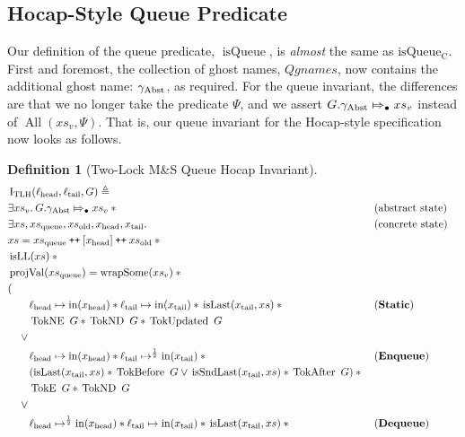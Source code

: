 \documentclass[a4paper, 10pt]{report}
\theoremstyle{definition}
\newtheorem{definition}{Definition}[section]
\newcommand{\msq}{M\&S Queue}
\newcommand{\tlmsq}{Two-Lock \msq{}}
\newcommand{\isqueue}{\operatorname{isQueue}}
\newcommand{\isqueueconc}{\operatorname{isQueue_{C}}}
\newcommand{\TLQueueInvariantHocap}{\operatorname{I_{TLH}}}
\newcommand{\Qgnames}{Qgnames}
\newcommand{\xsc}{xs}
\newcommand{\xsqueue}{xs_{\mathrm{queue}}}
\newcommand{\xsold}{xs_{\mathrm{old}}}
\newcommand{\isLL}{\operatorname{isLL}}
\newcommand{\AllP}{\operatorname{All}}
\newcommand{\projval}{\operatorname{projVal}}
\newcommand{\wrapsome}{\operatorname{wrapSome}}
\newcommand{\isLast}{\operatorname{isLast}}
\newcommand{\isSndLast}{\operatorname{isSndLast}}
\newcommand{\locN}[1]{\loc_{\mathrm{#1}}}
\newcommand{\lochead}{\locN{head}}
\newcommand{\loctail}{\locN{tail}}
\newcommand{\nIn}[1]{\operatorname{in}(#1)}
\newcommand{\node}{x}
\newcommand{\nodeN}[1]{\node_{\mathrm{#1}}}
\newcommand{\nodehead}{\nodeN{head}}
\newcommand{\nodetail}{\nodeN{tail}}
\newcommand{\absvalueList}{xs_v}
\newcommand{\StaticState}{\textbf{Static}\xspace}
\newcommand{\EnqueueState}{\textbf{Enqueue}\xspace}
\newcommand{\DequeueState}{\textbf{Dequeue}\xspace}
\newcommand{\Qg}{G}
\newcommand{\gabst}{\gname_{\mathrm{Abst}}}
\newcommand{\TokE}[1]{\operatorname{TokE} ~ #1}
\newcommand{\TokEQg}{\TokE{\Qg}}
\newcommand{\TokNE}[1]{\operatorname{TokNE} ~ #1}
\newcommand{\TokNEQg}{\TokNE{\Qg}}
\newcommand{\TokND}[1]{\operatorname{TokND} ~ #1}
\newcommand{\TokNDQg}{\TokND{\Qg}}
\newcommand{\TokBefore}[1]{\operatorname{TokBefore} ~ #1}
\newcommand{\TokBeforeQg}{\TokBefore{\Qg}}
\newcommand{\TokAfter}[1]{\operatorname{TokAfter} ~ #1}
\newcommand{\TokAfterQg}{\TokAfter{\Qg}}
\newcommand{\TokUpdated}[1]{\operatorname{TokUpdated} ~ #1}
\newcommand{\TokUpdatedQg}{\TokUpdated{\Qg}}
\newcommand\catenate{\mathbin{\text{\ttfamily\upshape ++}}}
\newcommand{\abstractstateauth}[2]{#1 \Mapsto_{\bullet} #2}
\begin{document}
\subsection{Hocap-Style Queue Predicate}
\label{TLMSQSPECS:hocap:sub:hocap-queue-pred}
Our definition of the queue predicate, $\isqueue$, is \emph{almost} the same as $\isqueueconc$. First and foremost, the collection of ghost names, $\Qgnames$, now contains the additional ghost name: $\gabst$, as required. For the queue invariant, the differences are that we no longer take the predicate $\Psi$, and we assert $\abstractstateauth{\Qg.\gabst}{\absvalueList}$ instead of $\AllP(\absvalueList, \Psi)$. That is, our queue invariant for the Hocap-style specification now looks as follows.
\begin{definition}[\tlmsq{} Hocap Invariant]\label{TLMSQ:spec:hocap:invariant}
  \begin{align*}
    &\TLQueueInvariantHocap(\lochead, \loctail, \Qg) \eqdef\\
    &\Exists \absvalueList. \abstractstateauth{\Qg.\gabst}{\absvalueList} \star{} &&\text{(abstract state)}\\
    &\Exists \xsc, \xsqueue, \xsold, \nodehead, \nodetail . &&\text{(concrete state)}\\
    &\xsc = \xsqueue \catenate [\nodehead] \catenate \xsold \star{}\\
    &\isLL(\xsc) \star{}\\
    &\projval(\xsqueue) = \wrapsome(\absvalueList) \star{}\\
    &(\\
    &\quad\quad\lochead \mapsto \nIn{\nodehead} \star{} \loctail \mapsto \nIn{\nodetail} \star{} \isLast(\nodetail, \xsc) \star{} &&\text{(\StaticState)}\\
    &\quad\quad \TokNEQg \star{} \TokNDQg \star{} \TokUpdatedQg\\
    &\quad\lor{}\\
    &\quad\quad\lochead \mapsto \nIn{\nodehead} \star{} \loctail \mapsto^{\frac{1}{2}} \nIn{\nodetail} \star{} &&\text{(\EnqueueState)}\\
    &\quad\quad (\isLast(\nodetail, \xsc) \star{} \TokBeforeQg \lor{} \isSndLast(\nodetail, \xsc) \star{} \TokAfterQg) \star{}\\
    &\quad\quad \TokEQg \star{} \TokNDQg\\
    &\quad\lor{}\\
    &\quad\quad\lochead \mapsto^{\frac{1}{2}} \nIn{\nodehead} \star{} \loctail \mapsto \nIn{\nodetail} \star{} \isLast(\nodetail, \xsc) \star{} &&\text{(\DequeueState)}\\

\end{align*}
\end{definition}
\end{document}
